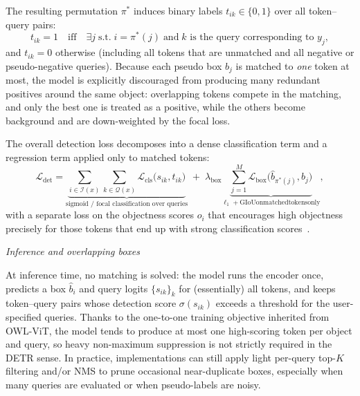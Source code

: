 \begin{enrichment}
\begin{enrichment}
\begin{enumerate}
			The resulting permutation $\pi^*$ induces binary labels $t_{ik} \in \{0,1\}$ over all token–query pairs:
			\[
			t_{ik} = 1
			\quad\text{iff}\quad
			\exists j
			\;\text{s.t.}\;
			i = \pi^*(j)
			\;\text{and}\;
			k \text{ is the query corresponding to } y_j,
			\]
			and $t_{ik} = 0$ otherwise (including all tokens that are unmatched and all negative or pseudo-negative queries). Because each pseudo box $b_j$ is matched to \emph{one} token at most, the model is explicitly discouraged from producing many redundant positives around the same object: overlapping tokens compete in the matching, and only the best one is treated as a positive, while the others become background and are down-weighted by the focal loss.
			
			\newpage
			
			The overall detection loss decomposes into a dense classification term and a regression term applied only to matched tokens:
			\[
			\mathcal{L}_\text{det}
			=
			\underbrace{\sum_{i \in \mathcal{I}(x)} \sum_{k \in \mathcal{Q}(x)}
				\mathcal{L}_\text{cls}\bigl(s_{ik}, t_{ik}\bigr)}_{\text{sigmoid / focal classification over queries}}
			\;+\;
			\lambda_\text{box}
			\underbrace{\sum_{j=1}^M
				\mathcal{L}_\text{box}\bigl(\hat{b}_{\pi^*(j)}, b_j\bigr)}_{\ell_1 + \mathrm{GIoU on matched tokens only}},
			\]
			with a separate loss on the objectness scores $o_i$ that encourages high objectness precisely for those tokens that end up with strong classification scores~\cite{minderer2024_owlvitv2}.
			
			\medskip
			\noindent
			\emph{Inference and overlapping boxes}
			
			At inference time, no matching is solved: the model runs the encoder once, predicts a box $\hat{b}_i$ and query logits $\{s_{ik}\}_{k}$ for (essentially) all tokens, and keeps token–query pairs whose detection score $\sigma(s_{ik})$ exceeds a threshold for the user-specified queries. Thanks to the one-to-one training objective inherited from OWL-ViT, the model tends to produce at most one high-scoring token per object and query, so heavy non-maximum suppression is not strictly required in the DETR sense. In practice, implementations can still apply light per-query top-$K$ filtering and/or NMS to prune occasional near-duplicate boxes, especially when many queries are evaluated or when pseudo-labels are noisy.
			

\end{enumerate}
\end{enrichment}
\end{enrichment}
